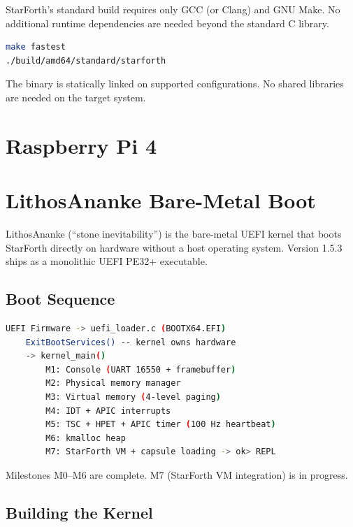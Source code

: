StarForth's standard build requires only GCC (or Clang) and GNU Make. No
additional runtime dependencies are needed beyond the standard C library.

\begin{lstlisting}[language=bash]
make fastest
./build/amd64/standard/starforth
\end{lstlisting}

The binary is statically linked on supported configurations. No shared
libraries are needed on the target system.


\chapter{Raspberry Pi 4}


\chapter{LithosAnanke Bare-Metal Boot}
\label{chap:lithos}

LithosAnanke (``stone inevitability'') is the bare-metal UEFI kernel that boots
StarForth directly on hardware without a host operating system. Version 1.5.3
ships as a monolithic UEFI PE32+ executable.

\section{Boot Sequence}
\label{sec:lithos-boot}

\begin{lstlisting}[language=bash]
UEFI Firmware -> uefi_loader.c (BOOTX64.EFI)
    ExitBootServices() -- kernel owns hardware
    -> kernel_main()
        M1: Console (UART 16550 + framebuffer)
        M2: Physical memory manager
        M3: Virtual memory (4-level paging)
        M4: IDT + APIC interrupts
        M5: TSC + HPET + APIC timer (100 Hz heartbeat)
        M6: kmalloc heap
        M7: StarForth VM + capsule loading -> ok> REPL
\end{lstlisting}

Milestones M0--M6 are complete. M7 (StarForth VM integration) is in progress.

\section{Building the Kernel}
\label{sec:lithos-build}

